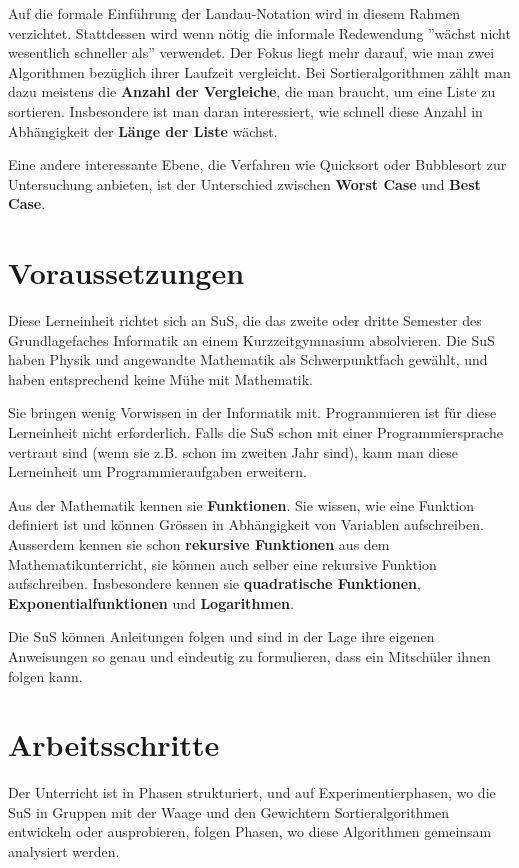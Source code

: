 \documentclass[
	12pt, %
	german, %
]{fphw}
\begin{document}
Auf die formale Einführung der Landau-Notation wird in diesem Rahmen verzichtet. Stattdessen wird wenn nötig die informale Redewendung ''wächst nicht wesentlich schneller als'' verwendet. Der Fokus liegt mehr darauf, wie man zwei Algorithmen bezüglich ihrer Laufzeit vergleicht. Bei Sortieralgorithmen zählt man dazu meistens die \textbf{Anzahl der Vergleiche}, die man braucht, um eine Liste zu sortieren. Insbesondere ist man daran interessiert, wie schnell diese Anzahl in Abhängigkeit der \textbf{Länge der Liste} wächst.

Eine andere interessante Ebene, die Verfahren wie Quicksort oder Bubblesort zur Untersuchung anbieten, ist der Unterschied zwischen \textbf{Worst Case}  und \textbf{Best Case}.

\section*{Voraussetzungen}

Diese Lerneinheit richtet sich an SuS, die das zweite oder dritte Semester des Grundlagefaches Informatik an einem Kurzzeitgymnasium absolvieren. Die SuS haben Physik und angewandte Mathematik als Schwerpunktfach gewählt, und haben entsprechend keine Mühe mit Mathematik.

Sie bringen wenig Vorwissen in der Informatik mit. Programmieren ist für diese Lerneinheit nicht erforderlich. Falls die SuS schon mit einer Programmiersprache vertraut sind (wenn sie z.B. schon im zweiten Jahr sind), kann man diese Lerneinheit um Programmieraufgaben erweitern.

Aus der Mathematik kennen sie \textbf{Funktionen}. Sie wissen, wie eine Funktion definiert ist und können Grössen in Abhängigkeit von Variablen aufschreiben. Ausserdem kennen sie schon \textbf{rekursive Funktionen} aus dem Mathematikunterricht, sie können auch selber eine rekursive Funktion aufschreiben. Insbesondere kennen sie \textbf{quadratische Funktionen}, \textbf{Exponentialfunktionen} und \textbf{Logarithmen}.

Die SuS können Anleitungen folgen und sind in der Lage ihre eigenen Anweisungen so genau und eindeutig zu formulieren, dass ein Mitschüler ihnen folgen kann.


\section*{Arbeitsschritte}

Der Unterricht ist in Phasen strukturiert, und auf Experimentierphasen, wo die SuS in Gruppen mit der Waage und den Gewichtern Sortieralgorithmen entwickeln oder ausprobieren, folgen Phasen, wo diese Algorithmen gemeinsam analysiert werden.
\end{document}

